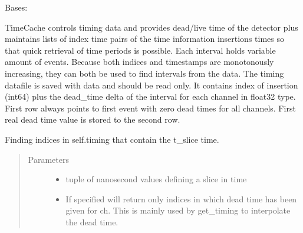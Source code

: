 \documentclass[letterpaper,10pt,english]{sphinxmanual}
\begin{document}

\begin{fulllineitems}
\label{\detokenize{autodocs/data:listmode.data.TimeCache}}
\sphinxAtStartPar
Bases: 

\sphinxAtStartPar
TimeCache controls timing data and provides dead/live time of the detector plus maintains lists of index \sphinxhyphen{} time
pairs of the time information insertions times so that quick retrieval of time periods is possible. Each interval
holds variable amount of events. Because both indices and timestamps are monotonously increasing, they can both be
used to find intervals from the data.
The timing datafile is saved with data and should be read only. It contains index of insertion (int64) plus
the dead\_time delta of the interval for each channel in float32 type. First row always points to first event with
zero dead times for all channels. First real dead time value is stored to the second row.

\begin{fulllineitems}
\label{\detokenize{autodocs/data:listmode.data.TimeCache.find}}
\sphinxAtStartPar
Finding indices in self.timing that contain the t\_slice time.
\begin{quote}\begin{description}
\item[{Parameters}] \leavevmode\begin{itemize}
\item {} 
\sphinxAtStartPar
{} \textendash{} tuple of nanosecond values defining a slice in time

\item {} 
\sphinxAtStartPar
{} \textendash{} If specified will return only indices in which dead time has been given for ch. This is mainly used
by get\_timing to interpolate the dead time.

\end{itemize}


\end{description}
\end{quote}
\end{fulllineitems}
\end{fulllineitems}
\end{document}
